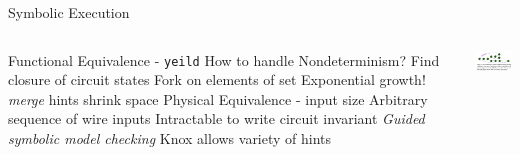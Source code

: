 \begin{frame}{Symbolic Execution}
  \begin{columns}
\begin{outline}
  \1 Functional Equivalence - \lstinline{yeild}
  \2 How to handle Nondeterminism?
  \2 Find closure of circuit states 
  \2 Fork on elements of set
  \2 Exponential growth!
  \2 \textit{merge} hints shrink space
  \1 Physical Equivalence - input size
  \2 Arbitrary sequence of wire inputs
  \2 Intractable to write circuit invariant
  \2 \textit{Guided symbolic model checking}
  \1 Knox allows variety of hints
\end{outline}
  \centering
  \begin{center}
  \includegraphics[width=4.5cm]{fig_10.png}
\end{center}
  \end{columns}
\end{frame}
